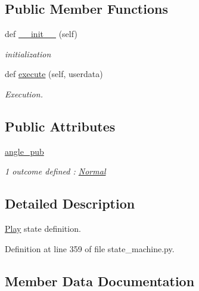 \subsection*{Public Member Functions}
\begin{DoxyCompactItemize}
\item 
\mbox{\label{classstate__machine_1_1Play_a5993a23d8be7f7b2647f71ede0334957}} 
def \hyperlink{classstate__machine_1_1Play_a5993a23d8be7f7b2647f71ede0334957}{\+\_\+\+\_\+init\+\_\+\+\_\+} (self)
\begin{DoxyCompactList}\small\item\em initialization \end{DoxyCompactList}\item 
\mbox{\label{classstate__machine_1_1Play_a04168d6842960585b4bbcf58f950547b}} 
def \hyperlink{classstate__machine_1_1Play_a04168d6842960585b4bbcf58f950547b}{execute} (self, userdata)
\begin{DoxyCompactList}\small\item\em Execution. \end{DoxyCompactList}\end{DoxyCompactItemize}
\subsection*{Public Attributes}
\begin{DoxyCompactItemize}
\item 
\hyperlink{classstate__machine_1_1Play_ad451724fb1afb5a066901dead8566553}{angle\+\_\+pub}
\begin{DoxyCompactList}\small\item\em 1 outcome defined \+: \hyperlink{classstate__machine_1_1Normal}{Normal} \end{DoxyCompactList}\end{DoxyCompactItemize}


\subsection{Detailed Description}
\hyperlink{classstate__machine_1_1Play}{Play} state definition. 

Definition at line 359 of file state\+\_\+machine.\+py.



\subsection{Member Data Documentation}
\mbox{\label{classstate__machine_1_1Play_ad451724fb1afb5a066901dead8566553}} 
